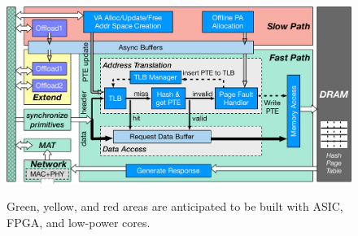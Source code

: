 {
\begin{figure}[t]
\begin{center}
\centerline{\includegraphics[width=\textwidth]{clio/Figures/CoreMem.pdf}}
{
Green, yellow, and red areas are anticipated to be built with 
ASIC, FPGA, and low-power cores.
}
\end{center}
\end{figure}
}
